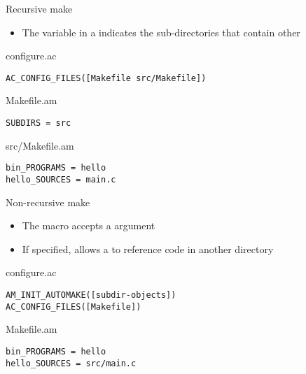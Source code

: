 \begin{frame}[fragile]{Recursive make}

  \begin{itemize}
  \item The  variable in a  indicates
    the sub-directories that contain other 
  \end{itemize}

  \begin{block}{configure.ac}
\begin{verbatim}
AC_CONFIG_FILES([Makefile src/Makefile])
\end{verbatim}
  \end{block}

  \begin{block}{Makefile.am}
\begin{verbatim}
SUBDIRS = src
\end{verbatim}
  \end{block}

  \begin{block}{src/Makefile.am}
\begin{verbatim}
bin_PROGRAMS = hello
hello_SOURCES = main.c
\end{verbatim}
  \end{block}
\end{frame}

\begin{frame}[fragile]{Non-recursive make}

  \begin{itemize}
  \item The  macro accepts a
     argument
  \item If specified, allows a  to reference code in
    another directory
  \end{itemize}

\begin{block}{configure.ac}
\begin{verbatim}
AM_INIT_AUTOMAKE([subdir-objects])
AC_CONFIG_FILES([Makefile])
\end{verbatim}
\end{block}

\begin{block}{Makefile.am}
\begin{verbatim}
bin_PROGRAMS = hello
hello_SOURCES = src/main.c
\end{verbatim}
\end{block}

\end{frame}

